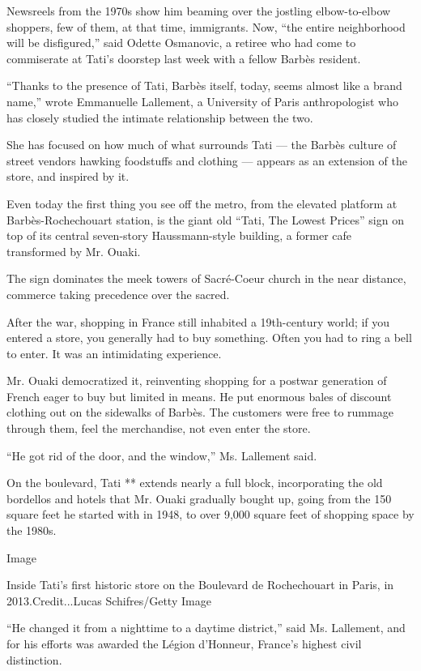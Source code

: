 Newsreels from the 1970s show him beaming over the jostling
elbow-to-elbow shoppers, few of them, at that time, immigrants. Now,
``the entire neighborhood will be disfigured,'' said Odette Osmanovic, a
retiree who had come to commiserate at Tati's doorstep last week with a
fellow Barbès resident.

``Thanks to the presence of Tati, Barbès itself, today, seems almost
like a brand name,'' wrote Emmanuelle Lallement, a University of Paris
anthropologist who has closely studied the intimate relationship between
the two.

She has focused on how much of what surrounds Tati --- the Barbès
culture of street vendors hawking foodstuffs and clothing --- appears as
an extension of the store, and inspired by it.

Even today the first thing you see off the metro, from the elevated
platform at Barbès-Rochechouart station, is the giant old ``Tati, The
Lowest Prices'' sign on top of its central seven-story Haussmann-style
building, a former cafe transformed by Mr. Ouaki.

The sign dominates the meek towers of Sacré-Coeur church in the near
distance, commerce taking precedence over the sacred.

After the war, shopping in France still inhabited a 19th-century world;
if you entered a store, you generally had to buy something. Often you
had to ring a bell to enter. It was an intimidating experience.

Mr. Ouaki democratized it, reinventing shopping for a postwar generation
of French eager to buy but limited in means. He put enormous bales of
discount clothing out on the sidewalks of Barbès. The customers were
free to rummage through them, feel the merchandise, not even enter the
store.

``He got rid of the door, and the window,'' Ms. Lallement said.

On the boulevard, Tati ** extends nearly a full block, incorporating the
old bordellos and hotels that Mr. Ouaki gradually bought up, going from
the 150 square feet he started with in 1948, to over 9,000 square feet
of shopping space by the 1980s.

Image

Inside Tati's first historic store on the Boulevard de Rochechouart in
Paris, in 2013.Credit...Lucas Schifres/Getty Image

``He changed it from a nighttime to a daytime district,'' said Ms.
Lallement, and for his efforts was awarded the Légion d'Honneur,
France's highest civil distinction.

